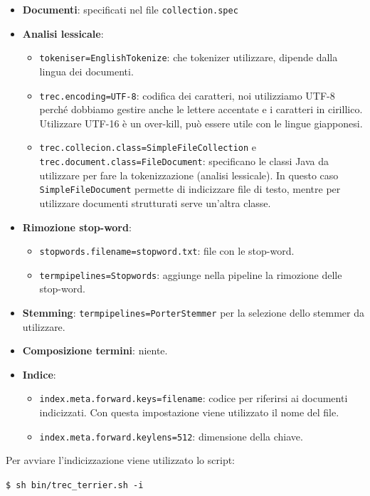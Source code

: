 \begin{itemize}
	\item \textbf{Documenti}: specificati nel file \texttt{collection.spec}
	\item \textbf{Analisi lessicale}:
	\begin{itemize}
		\item \texttt{tokeniser=EnglishTokenize}: che tokenizer utilizzare, dipende dalla lingua dei documenti.
		\item \texttt{trec.encoding=UTF-8}: codifica dei caratteri, noi utilizziamo UTF-8 perché dobbiamo gestire anche le lettere accentate e i caratteri in cirillico. Utilizzare UTF-16 è un over-kill, può essere utile con le lingue giapponesi.
		\item \texttt{trec.collecion.class=SimpleFileCollection} e \texttt{trec.document.class=FileDocument}: specificano le classi Java da utilizzare per fare la tokenizzazione (analisi lessicale). In questo caso \texttt{SimpleFileDocument} permette di indicizzare file di testo, mentre per utilizzare documenti strutturati serve un'altra classe.
	\end{itemize}
	\item \textbf{Rimozione stop-word}:
	\begin{itemize}
		\item \texttt{stopwords.filename=stopword.txt}: file con le stop-word.
		\item \texttt{termpipelines=Stopwords}: aggiunge nella pipeline la rimozione delle stop-word.
	\end{itemize}
	\item \textbf{Stemming}: \texttt{termpipelines=PorterStemmer} per la selezione dello stemmer da utilizzare.
	\item \textbf{Composizione termini}: niente.
	\item \textbf{Indice}:
	\begin{itemize}
		\item \texttt{index.meta.forward.keys=filename}: codice per riferirsi ai documenti indicizzati. Con questa impostazione viene utilizzato il nome del file.
		\item \texttt{index.meta.forward.keylens=512}: dimensione della chiave.
	\end{itemize}
\end{itemize}

\noindent Per avviare l'indicizzazione viene utilizzato lo script:

\begin{centering}
	\texttt{\$ sh bin/trec\_terrier.sh -i}
\end{centering}


